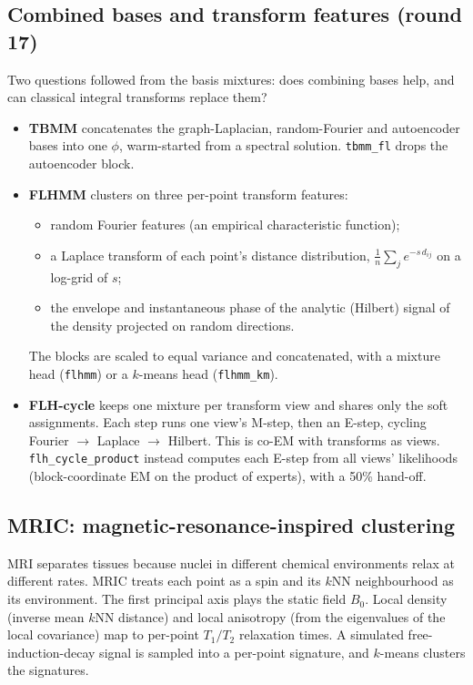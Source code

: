 \documentclass[11pt,a4paper]{article}
\newcommand{\code}[1]{\texttt{#1}}
\begin{document}
\subsection{Combined bases and transform features (round 17)}\label{sec:transforms}
Two questions followed from the basis mixtures: does combining bases help,
and can classical integral transforms replace them?
\begin{itemize}
  \item \textbf{TBMM} concatenates the graph-Laplacian, random-Fourier and
  autoencoder bases into one $\phi$, warm-started from a spectral solution.
  \code{tbmm\_fl} drops the autoencoder block.
  \item \textbf{FLHMM} clusters on three per-point transform features:
  \begin{itemize}
    \item random Fourier features (an empirical characteristic function);
    \item a Laplace transform of each point's distance distribution,
    $\tfrac1n\sum_j e^{-s\,d_{ij}}$ on a log-grid of $s$;
    \item the envelope and instantaneous phase of the analytic (Hilbert)
    signal of the density projected on random directions.
  \end{itemize}
  The blocks are scaled to equal variance and concatenated, with a mixture
  head (\code{flhmm}) or a $k$-means head (\code{flhmm\_km}).
  \item \textbf{FLH-cycle} keeps one mixture per transform view and shares
  only the soft assignments. Each step runs one view's M-step, then an
  E-step, cycling Fourier $\to$ Laplace $\to$ Hilbert. This is co-EM
  \cite{nigam2000analyzing,bickel2004multiview} with transforms as views.
  \code{flh\_cycle\_product} instead computes each E-step from all views'
  likelihoods (block-coordinate EM on the product of experts), with a 50\%
  hand-off.
\end{itemize}

\subsection{MRIC: magnetic-resonance-inspired clustering}
MRI separates tissues because nuclei in different chemical environments relax
at different rates. MRIC treats each point as a spin and its $k$NN
neighbourhood as its environment. The first principal axis plays the static
field $B_0$. Local density (inverse mean $k$NN distance) and local anisotropy
(from the eigenvalues of the local covariance) map to per-point $T_1/T_2$
relaxation times. A simulated free-induction-decay signal is sampled into a
per-point signature, and $k$-means clusters the signatures.
\end{document}
